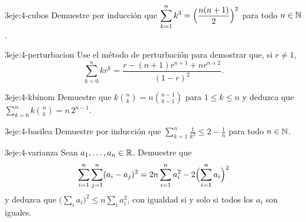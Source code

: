 \begin{ejercicio}{3}{eje:4-cubos}
Demuestre por inducción que $\displaystyle\sum_{k=1}^nk^3=\Bigl(\frac{n(n+1)}2\Bigr)^2$ para todo $n\in\mathbb{N}$.
\end{ejercicio}

\begin{ejercicio}{3}{eje:4-perturbacion}
Use el método de perturbación para demostrar que, si $r\neq1$,
\[
\sum_{k=0}^nkr^k=\frac{r-(n+1)r^{n+1}+nr^{n+2}}{(1-r)^2}.
\]
\end{ejercicio}

\begin{ejercicio}{3}{eje:4-kbinom}
Demuestre que $k\binom nk=n\binom{n-1}{k-1}$ para $1\le k\le n$ y deduzca que $\sum_{k=0}^nk\binom nk=n\,2^{n-1}$.
\end{ejercicio}

\begin{ejercicio}{3}{eje:4-basilea}
Demuestre por inducción que $\displaystyle\sum_{k=1}^n\frac1{k^2}\le2-\frac1n$ para todo $n\in\mathbb{N}$.
\end{ejercicio}

\begin{ejercicio}{3}{eje:4-varianza}
Sean $a_1,\dots,a_n\in\mathbb{R}$. Demuestre que
\[
\sum_{i=1}^n\sum_{j=1}^n(a_i-a_j)^2=2n\sum_{i=1}^na_i^2-2\Bigl(\sum_{i=1}^na_i\Bigr)^2
\]
y deduzca que $\bigl(\sum_ia_i\bigr)^2\le n\sum_ia_i^2$, con igualdad si y solo si todos los $a_i$ son iguales.
\end{ejercicio}
